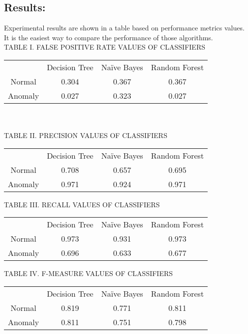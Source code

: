\documentclass[conference]{IEEEtran}
\begin{document}
\subsection{Results:}
Experimental results are shown in a table based on performance metrics values. It is the easiest way to compare the performance of those algorithms.\\ 

TABLE I. FALSE POSITIVE RATE VALUES OF CLASSIFIERS



\begin{center}
\begin{tabular}{ |c|c|c|c| } 
 \hline
& Decision
Tree & Naïve Bayes & Random Forest \\ 
 Normal & 0.304     & 0.367     & 0.367     \\ 
 Anomaly & 0.027     & 0.323     & 0.027     \\ 
 \hline
\end{tabular}
\end{center}  \\ \\ 


TABLE II. PRECISION VALUES OF CLASSIFIERS
\begin{center}
\begin{tabular}{ |c|c|c|c| } 
 \hline
& Decision
Tree & Naïve Bayes & Random Forest \\ 
  Normal & 0.708           & 0.657           & 0.695           \\ 
   Anomaly & 0.971          &  0.924           &  0.971    \\ 
 \hline
\end{tabular}
\end{center}
   
 TABLE III. RECALL VALUES OF CLASSIFIERS
\begin{center}
\begin{tabular}{ |c|c|c|c| } 
 \hline
 & Decision
Tree & Naïve Bayes & Random Forest \\ 
 Normal & 0.973           &  0.931          & 0.973  \\ 
 Anomaly &  0.696          &   0.633          &   0.677   \\ 
 \hline
\end{tabular}
\end{center}

TABLE IV. F-MEASURE VALUES OF CLASSIFIERS
\begin{center}
\begin{tabular}{ |c|c|c|c| } 
 \hline
 & Decision
Tree & Naïve Bayes & Random Forest \\ 
 Normal &  0.819           &   0.771         &  0.811    \\ 
 Anomaly &  0.811          &   0.751          &  0.798    \\ 
 \hline
\end{tabular}
\end{center}
\end{document}
